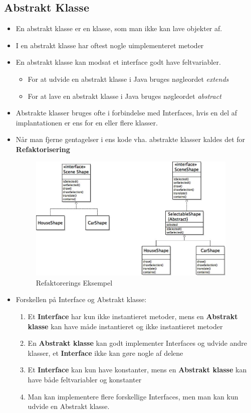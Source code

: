 \documentclass{article}
\begin{document}
\subsection{Abstrakt Klasse}
\begin{itemize}
	\item En abstrakt klasse er en klasse, som man ikke kan lave objekter af.
	\item I en abstrakt klasse har oftest nogle uimplementeret metoder 
	\item En abstrakt klasse kan modsat et interface godt have feltvariabler. 
	\begin{itemize}
		\item For at udvide en abstrakt klasse i Java bruges nøgleordet \textit{extends}
		\item For at lave en abstrakt klasse i Java bruges nøgleordet \textit{abstract} 
	\end{itemize}
	\item Abstrakte klasser bruges ofte i forbindelse med Interfaces, hvis en del af implantationen er ens for en eller flere klasser.
	\item Når man fjerne gentagelser i ens kode vha. abstrakte klasser kaldes det for \textbf{Refaktorisering}
	\begin{figure}[ht!]
		\centering
		\includegraphics[width=100mm]{img/UMLabstract.jpeg}
		\caption{Refaktorerings Eksempel  \label{UMLinterface}}
	\end{figure}
	\item Forskellen på Interface og Abstrakt klasse:
	\begin{enumerate}
		\item Et \textbf{Interface} har kun ikke instantieret metoder, mens en \textbf{Abstrakt klasse} kan have måde instantieret og ikke instantieret metoder 
		\item En \textbf{Abstrakt klasse} kan godt implementer Interfaces og udvide andre klasser, et \textbf{Interface} ikke kan gøre nogle af delene
		\item Et \textbf{Interface} kan kun have konstanter, mens en \textbf{Abstrakt klasse} kan have både feltvariabler og konstanter
		\item Man kan implementere flere forskellige Interfaces, men man kan kun udvide en Abstrakt klasse.
	\end{enumerate}
\end{itemize}
\end{document}

